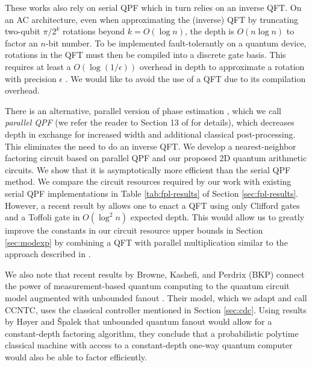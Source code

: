 These works also rely on serial QPF which in turn relies on an inverse QFT.
On an AC architecture, even when approximating the (inverse) QFT by truncating two-qubit
$\pi/2^k$ rotations beyond $k = O(\log n)$, 
the depth is $O(n \log n)$ to factor an $n$-bit number.
To be implemented fault-tolerantly on a quantum device, rotations in the QFT must then be compiled into a discrete gate basis.
This requires at least a $O(\log(1/\epsilon))$ overhead in depth to approximate a rotation with precision $\epsilon$ \cite{Harrow2002, Kitaev2002}.
We would like to avoid the use of a QFT due to its compilation overhead.

There is an alternative, parallel version of phase estimation 
\cite{Cleve2000,Kitaev2002}, which we call \emph{parallel QPF} (we refer the reader to Section 13 of \cite{Kitaev2002} for details), which decreases depth in exchange
for increased width and additional classical post-processing.
This eliminates the need to do an inverse QFT.
We develop a nearest-neighbor factoring circuit based on parallel QPF and our proposed 2D quantum arithmetic circuits.
We show that it is asymptotically more efficient than the serial QPF method. 
We compare the circuit resources required by our work with existing serial QPF implementations in Table
\ref{tab:fpl-results} of Section \ref{sec:fpl-results}.
However, a recent result by \cite{Jones2013} allows one to enact a
QFT using only Clifford gates and a Toffoli gate in $O(\log^2 n)$ expected depth.
This would allow us to
greatly improve the constants in our circuit resource upper bounds in Section \ref{sec:modexp} by combining a QFT with parallel multiplication similar to
the approach described in \cite{VanMeter2005,Cleve2000}.


We also note that recent results by Browne, Kashefi, and Perdrix (BKP) connect the power of
measurement-based quantum computing to the quantum circuit model augmented with
unbounded fanout \cite{Browne2009}. Their model, which we adapt and call
\textsf{CCNTC}, uses the classical controller mentioned in Section \ref{sec:cdc}.
Using results by H{\o}yer and {\v S}palek \cite{Hoyer2002} that
unbounded quantum fanout would allow for a constant-depth factoring algorithm,
they conclude that a probabilistic polytime classical machine with access
to a constant-depth one-way quantum computer would also be able to factor
efficiently.
